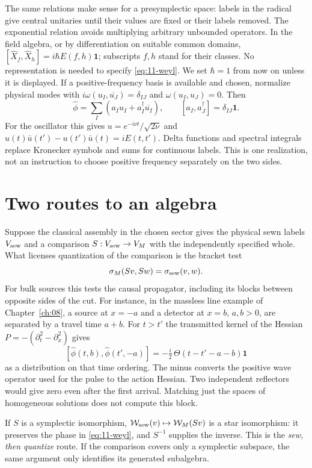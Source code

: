 The same relations make sense for a presymplectic space: labels in the
radical give central unitaries until their values are fixed or their labels
removed. The exponential relation avoids multiplying arbitrary unbounded
operators. In the field algebra, or by differentiation on suitable common domains,
$[\widehat X_f,\widehat X_h]=i\hbar E(f,h)\mathbf 1$; subscripts $f,h$
stand for their classes. No representation is needed to specify
\eqref{eq:11-weyl}. We set $\hbar=1$ from now on unless it is displayed.
If a positive-frequency basis is available and chosen, normalize physical
modes with $i\omega(u_I,\overline{u_J})=\delta_{IJ}$ and
$\omega(u_I,u_J)=0$. Then
\[
 \widehat\phi=\sum_I(a_Iu_I+a_I^\dagger\overline{u_I}),\qquad
 [a_I,a_J^\dagger]=\delta_{IJ}\mathbf 1 .
\]
For the oscillator this gives $u=e^{-i\nu t}/\sqrt{2\nu}$ and
$u(t)\bar u(t')-u(t')\bar u(t)=iE(t,t')$. Delta functions and spectral
integrals replace Kronecker symbols and sums for continuous labels. This is
one realization, not an instruction to choose positive frequency separately
on the two sides.

\section{Two routes to an algebra}
Suppose the classical assembly in the chosen sector gives the physical sewn
labels $V_{\rm sew}$ and a comparison $S:V_{\rm sew}\to V_M$ with the
independently specified whole. What licenses quantization of the comparison
is the bracket test
\[
 \sigma_M(Sv,Sw)=\sigma_{\rm sew}(v,w).
\]
For bulk sources this tests the causal propagator, including its blocks
between opposite sides of the cut. For instance, in the massless line
example of Chapter~\ref{ch:08}, a source at $x=-a$ and a detector at
$x=b$, $a,b>0$, are separated by a travel time $a+b$. For $t>t'$ the
transmitted kernel of the Hessian $P=-(\partial_t^2-\partial_x^2)$ gives
\[
 [\widehat\phi(t,b),\widehat\phi(t',-a)]
 =-\tfrac i2\,\Theta(t-t'-a-b)\mathbf1
\]
as a distribution on that time ordering. The minus converts the positive
wave operator used for the pulse to the action Hessian. Two independent
reflectors would give zero even after the first arrival. Matching just the
spaces of homogeneous solutions does not compute this block.

If $S$ is a symplectic isomorphism, $\mathcal W_{\rm sew}(v)\mapsto\mathcal W_M(Sv)$
is a star isomorphism: it preserves the phase in \eqref{eq:11-weyl}, and
$S^{-1}$ supplies the inverse. This is the \emph{sew, then quantize} route.
If the comparison covers only a symplectic subspace, the same argument only
identifies its generated subalgebra.

